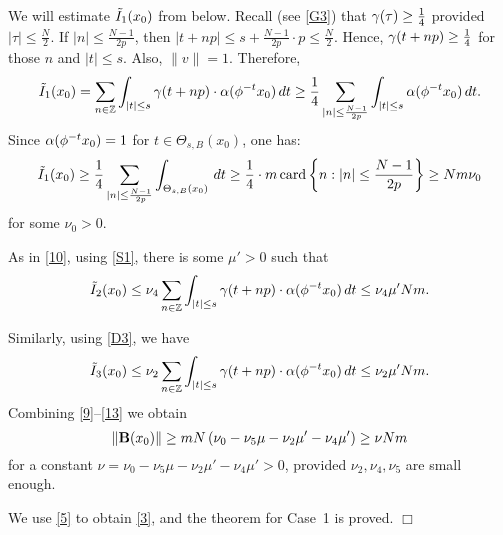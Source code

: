 We will estimate $\tilde I_1 (x_0)$ from below. 
Recall (see \eqref{G3}) that $\gamma (\tau) \geq \frac14$ provided
 $|\tau| \leq \frac{N}2$.
If $|n| \leq \frac{N-1}{2p}$, then $|t+np| \leq s+
\frac{N-1}{2p} \cdot p \leq \frac{N}2$.  
Hence, $\gamma (t+np) \geq \frac14$
for those $n$ and $|t|\leq s$. Also, $\| v\| =1$. Therefore,
\[\tilde I_1 (x_0) = \sum_{n\in{\Bbb{Z}}} \int_{|t| \leq s} \gamma (t+np) \cdot \alpha
(\phi^{-t} x_0) \, dt \geq
\frac{1}4\sum_{|n|\leq\frac{N-1}{2p}} \int_{|t| \leq s} \alpha
(\phi^{-t} x_0) \, dt.\]
Since  $\alpha
(\phi^{-t} x_0) =1$ for $t\in \Theta_{s,B} (x_0)$, one has:
\begin{equation}
\ti I_1 (x_0)  \geq \frac{1}4 \sum_{|n| \leq
\frac{N-1}{2p}}  
\int_{\Theta_{s,B} (x_0)}\, dt \geq \dfrac14 \cdot m \card
\left\{ n: |n| \leq \dfrac{N-1}{2p}\right\} \geq N m \nu_0
\lb{11}
\end{equation}
for some  $\nu_0 > 0$.

As in \eqref{10},  using \eqref{S1}, there is 
some $\mu'>0$ such that
\begin{equation}
\ti I_2(x_0) \leq \nu_4 \sum_{n\in \bbZ} \int_{|t| 
\leq s} \gam (t+np)\cdot \al
(\phi^{-t} x_0) \,
dt \leq \nu_4 \mu' N m.
\lb{12}
\end{equation}

Similarly,  using \eqref{D3}, we have
\begin{equation}
\ti I_3 (x_0 ) \leq \nu_2 \sum_{n\in\bbZ} \int_{|t|\leq s} \gam
(t+np) \cdot \al
(\phi^{-t} x_0)\, dt \leq \nu_2 \mu' N m.
\lb{13}
\end{equation}
Combining \eqref{9}--\eqref{13} we obtain
\[
\| {\bold B}(x_0)\| \geq m N \left(\nu_0-\nu_5 \mu-\nu_2\mu'-\nu_4\mu' \right) 
\geq \nu N m
\]
for a constant $\nu=\nu_0-\nu_5 \mu-\nu_2\mu'-\nu_4\mu'>0$, 
provided $\nu_2, \nu_4, \nu_5$ are small enough.

We use \eqref{5} to obtain \eqref{3}, 
and the theorem for Case~1 is proved.
\quad $\Box$

